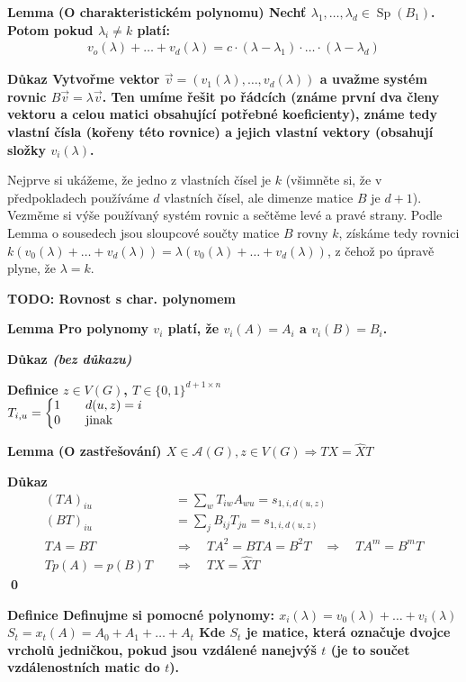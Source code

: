 \documentclass[a4paper,12pt,titlepage]{article}
\newcommand{\lm}{\smallskip\noindent\bf Lemma\rm{} }
\newcommand{\dk}{\smallskip\noindent\bf Důkaz\rm{} }
\newcommand{\df}{\smallskip\noindent\bf Definice\rm{} }
\newcommand{\A}{\mathcal{A}}
\newcommand{\todo}[1]{\bf TODO: \rm#1}
\DeclareMathOperator{\Sp}{Sp}
\begin{document}
\lm (O charakteristickém polynomu) Nechť $\lambda_1,\ldots,\lambda_d \in \Sp(B_1)$. Potom pokud $\lambda_i \neq k$ platí:
\begin{align}
	v_o(\lambda) + \ldots + v_d(\lambda) = c \cdot (\lambda - \lambda_1) \cdot \ldots \cdot (\lambda - \lambda_d)
\end{align}

\dk Vytvořme vektor $\vec{v} = (v_1(\lambda), \ldots, v_d(\lambda))$ a uvažme systém rovnic $B\vec{v} = \lambda \vec{v}$. Ten umíme řešit po řádcích (známe první dva členy vektoru a celou matici obsahující potřebné koeficienty), známe tedy vlastní čísla (kořeny této rovnice) a jejich vlastní vektory (obsahují složky $v_i(\lambda)$.

Nejprve si ukážeme, že jedno z vlastních čísel je $k$ (všimněte si, že v předpokladech používáme $d$ vlastních čísel, ale dimenze matice $B$ je $d+1$). Vezměme si výše používaný systém rovnic a sečtěme levé a pravé strany. Podle Lemma o sousedech jsou sloupcové součty matice $B$ rovny $k$, získáme tedy rovnici $k(v_0(\lambda) + \ldots + v_d(\lambda)) = \lambda (v_0(\lambda) + \ldots + v_d(\lambda))$, z čehož po úpravě plyne, že $\lambda = k$.

\todo{Rovnost s char. polynomem}

\lm Pro polynomy $v_i$ platí, že $v_i(A) = A_i$ a $v_i(B) = B_i$.

\dk {\it(bez důkazu)}


\df $z\in V(G)$, $T\in\{0,1\}^{d+1 \times n}$\\
\indent $T_{i,u} = \left\{\begin{matrix}
1\quad & d(u,z) = i\hfill \\
0\quad & \text{jinak}\hfill
\end{matrix}\right.$

\lm (O zastřešování) $X\in\A(G), z\in V(G) \Rightarrow TX = \widehat XT$

\dk 
\begin{align*}
(TA)_{iu} &= \sum_w T_{iw}A_{wu} = s_{1,i,d(u,z)} \\
(BT)_{iu} &= \sum_j B_{ij}T_{ju} = s_{1,i,d(u,z)} \\
TA = BT \quad&\Rightarrow\quad TA^2 = BTA = B^2T \quad\Rightarrow\quad TA^m = B^mT \\
Tp(A) = p(B)T \quad&\Rightarrow\quad TX = \widehat XT
\end{align*}
\qed

\df Definujme si pomocné polynomy: 
	$x_i(\lambda) = v_0(\lambda) + \dots + v_i(\lambda)$ \hfil $S_t = x_t(A) = A_0 + A_1 + \dots + A_t$
Kde $S_t$ je matice, která označuje dvojce vrcholů jedničkou, pokud jsou vzdálené nanejvýš $t$ (je to součet vzdálenostních matic do $t$).
\end{document}
